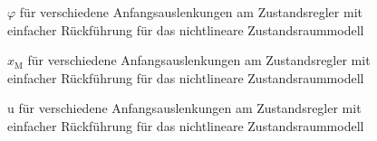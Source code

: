 \begin{figure}[H]
    \centering
    \caption[$\varphi$ für Regler mit einfacher Rückführung (nichtlinear)]{$\varphi$ für verschiedene Anfangsauslenkungen am Zustandsregler mit einfacher Rückführung für das nichtlineare Zustandsraummodell}
    \label{fig:Bild29}
\end{figure}

\begin{figure}[H]
    \centering
    \caption[$x_{\mathrm{M}}$ für Regler mit einfacher Rückführung (nichtlinear)]{$x_{\mathrm{M}}$ für verschiedene Anfangsauslenkungen am Zustandsregler mit einfacher Rückführung für das nichtlineare Zustandsraummodell}
    \label{fig:Bild30}
\end{figure}

\begin{figure}[H]
    \centering
    \caption[u für Regler mit einfacher Rückführung (nichtlinear)]{u für verschiedene Anfangsauslenkungen am Zustandsregler mit einfacher Rückführung für das nichtlineare Zustandsraummodell}
    \label{fig:Bild31}
\end{figure}


